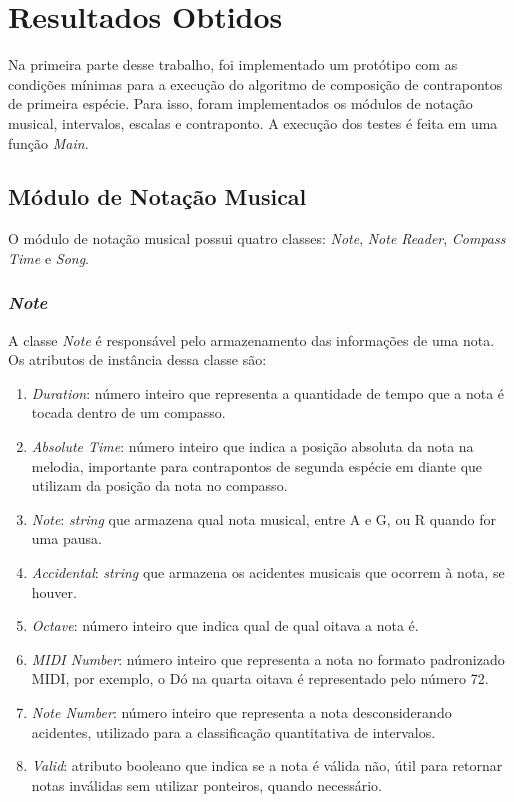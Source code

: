 \chapter[Resultados Obtidos]{Resultados Obtidos}

  Na primeira parte desse trabalho, foi implementado um protótipo com as condições mínimas para a execução do algoritmo de composição de contrapontos de primeira espécie. Para isso, foram implementados os módulos de notação musical, intervalos, escalas e contraponto. A execução dos testes é feita em uma função \textit{Main}.

  \section[Módulo de Notação Musical]{Módulo de Notação Musical}

    O módulo de notação musical possui quatro classes: \textit{Note}, \textit{Note Reader}, \textit{Compass Time} e \textit{Song}.

    \subsection[\textit{Note}]{\textit{Note}}

      A classe \textit{Note} é responsável pelo armazenamento das informações de uma nota. Os atributos de instância dessa classe são:

      \begin{enumerate}
        \item \textit{Duration}: número inteiro que representa a quantidade de tempo que a nota é tocada dentro de um compasso.
        \item \textit{Absolute Time}: número inteiro que indica a posição absoluta da nota na melodia, importante para contrapontos de segunda espécie em diante que utilizam da posição da nota no compasso.
        \item \textit{Note}: \textit{string} que armazena qual nota musical, entre A e G, ou R quando for uma pausa.
        \item \textit{Accidental}: \textit{string} que armazena os acidentes musicais que ocorrem à nota, se houver.
        \item \textit{Octave}: número inteiro que indica qual de qual oitava a nota é.
        \item \textit{MIDI Number}: número inteiro que representa a nota no formato padronizado MIDI, por exemplo, o Dó na quarta oitava é representado pelo número 72.
        \item \textit{Note Number}: número inteiro que representa a nota desconsiderando acidentes, utilizado para a classificação quantitativa de intervalos.
        \item \textit{Valid}: atributo booleano que indica se a nota é válida não, útil para retornar notas inválidas sem utilizar ponteiros, quando necessário.
      \end{enumerate}

